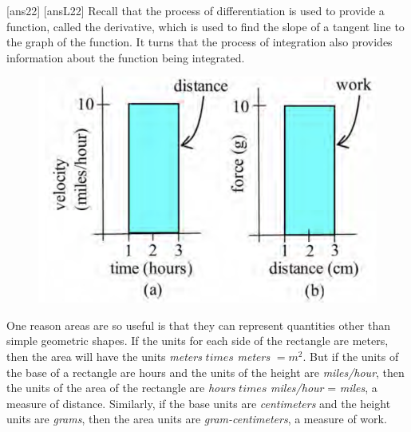 
\newpage
[ans22]
[ansL22]
\noindent Recall that the process of differentiation is used to provide a function, called the derivative, which is used to find the slope of a tangent line to the graph of the function.  It turns that the process of integration also provides information about the function being integrated. \\

\begin{figure}

\includegraphics[scale=0.4]{images/defIntgArea/velocity_force.png}
\caption{ }
\label{fig:velocity_force}
\end{figure}

\noindent One reason areas are so useful is that they can represent quantities other than simple geometric shapes. If the units for each side of the rectangle are meters, then the area will have the units \emph{meters} $times$ \emph{meters} $=m^2$. But if the units of the base of a rectangle are hours and the units of the height are \emph{miles/hour}, then the units of the area of the rectangle are \emph{hours} $times$ \emph{miles/hour} = \emph{miles}, a measure of distance. Similarly, if the base units are \emph{centimeters} and the height units are \emph{grams}, then the area units are \emph{gram-centimeters}, a measure of work.\\

